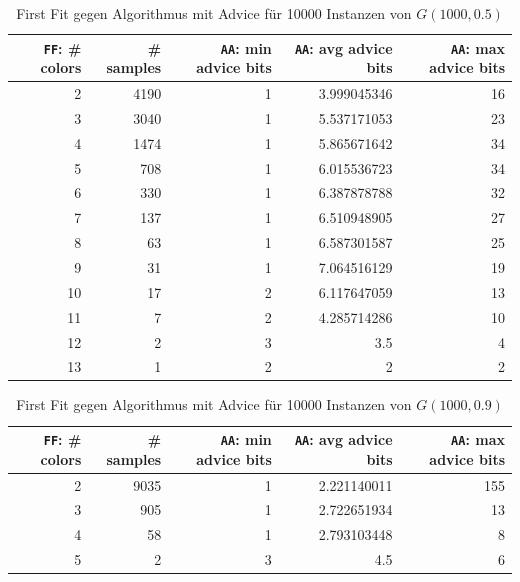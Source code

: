 \documentclass[11pt,abstracton]{scrreprt} %
\theoremstyle{definition}
\begin{document}
\begin{table}
\caption{First Fit gegen Algorithmus mit Advice für 10000 Instanzen von $G(1000, 0.5)$}
\label{tab.exp1p05}
  \centering
    \begin{tabular}{rrrrr}
    \toprule
    {\tt{FF}}: \# colors & \# samples & {\tt{AA}}: min advice bits & {\tt{AA}}: avg advice bits & {\tt{AA}}: max advice bits \\
    \midrule
2     & 4190  & 1     & 3.999045346 & 16 \\
3     & 3040  & 1     & 5.537171053 & 23 \\
4     & 1474  & 1     & 5.865671642 & 34 \\
5     & 708   & 1     & 6.015536723 & 34 \\
6     & 330   & 1     & 6.387878788 & 32 \\
7     & 137   & 1     & 6.510948905 & 27 \\
8     & 63    & 1     & 6.587301587 & 25 \\
9     & 31    & 1     & 7.064516129 & 19 \\
10    & 17    & 2     & 6.117647059 & 13 \\
11    & 7     & 2     & 4.285714286 & 10 \\
12    & 2     & 3     & 3.5   & 4 \\
13    & 1     & 2     & 2     & 2 \\


    \bottomrule
    \end{tabular}%

\end{table}

\begin{table}
\caption{First Fit gegen Algorithmus mit Advice für 10000 Instanzen von $G(1000, 0.9)$}
\label{tab.exp1p09}
  \centering
\begin{tabular}{rrrrr}
\toprule
    {\tt{FF}}: \# colors & \# samples & {\tt{AA}}: min advice bits & {\tt{AA}}: avg advice bits & {\tt{AA}}: max advice bits \\
\midrule
2     & 9035  & 1     & 2.221140011 & 155 \\
3     & 905   & 1     & 2.722651934 & 13 \\
4     & 58    & 1     & 2.793103448 & 8 \\
5     & 2     & 3     & 4.5   & 6 \\
\bottomrule
\end{tabular}%


\end{table}
\end{document}

